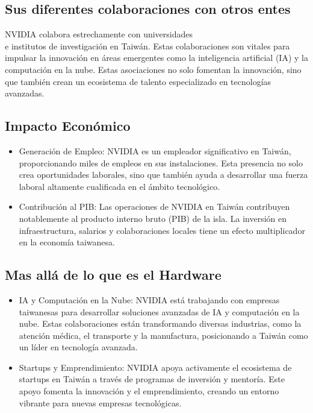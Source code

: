 \documentclass[letterpaper, 12pt]{article}
\begin{document}
\subsection*{Sus diferentes colaboraciones con otros entes}

NVIDIA colabora estrechamente con universidades \\
e institutos de investigación en Taiwán. Estas colaboraciones son vitales para
impulsar la innovación en áreas emergentes como la inteligencia
artificial (IA) y la computación en la nube. Estas asociaciones no
solo fomentan la innovación, sino que también crean un ecosistema de
talento especializado en tecnologías avanzadas.

\subsection*{Impacto Económico}

\begin{itemize}
      \item Generación de Empleo:
            NVIDIA es un empleador significativo en Taiwán,
            proporcionando miles de empleos en sus instalaciones.
            Esta presencia no solo crea oportunidades laborales, sino
            que también ayuda a desarrollar una fuerza laboral altamente
            cualificada en el ámbito tecnológico.

      \item Contribución al PIB:\@{}
            Las operaciones de NVIDIA en Taiwán contribuyen
            notablemente al producto interno bruto (PIB) de
            la isla. La inversión en infraestructura, salarios y
            colaboraciones locales tiene un efecto multiplicador en
            la economía taiwanesa.

\end{itemize}

\subsection{Mas allá de lo que es el Hardware}

\begin{itemize}
      \item IA y Computación en la Nube:
            NVIDIA está trabajando con empresas taiwanesas para
            desarrollar soluciones avanzadas de IA y computación en
            la nube. Estas colaboraciones están transformando diversas
            industrias, como la atención médica, el transporte y la
            manufactura, posicionando a Taiwán como un líder en
            tecnología avanzada.

      \item Startups y Emprendimiento:
            NVIDIA apoya activamente el ecosistema de startups en
            Taiwán a través de programas de inversión y mentoría.
            Este apoyo fomenta la innovación y el emprendimiento,
            creando un entorno vibrante para nuevas empresas tecnológicas.

\end{itemize}
\end{document}
